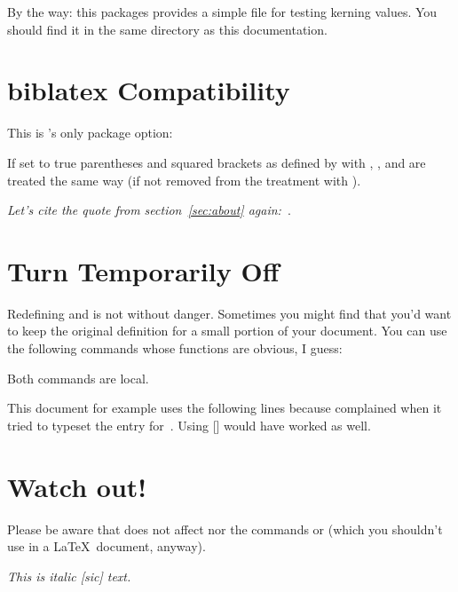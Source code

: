 \documentclass[DIV10,toc=index,toc=bib]{cnpkgdoc}
\begin{document}
By the way: this packages provides a simple file 
for testing kerning values. You should find it in the same directory as this
documentation.

\section{biblatex Compatibility}
This is \embrac's only package option:
\begin{beschreibung}
  If set to true parentheses
 and squared brackets as defined by  with ,
 ,  and  are treated
 the same way (if not removed from the treatment with ).
\end{beschreibung}

\begin{beispiel}
 \emph{Let's cite the quote from section~\ref{sec:about} again:~\cite{bringhurst04}}.
\end{beispiel}

\section{Turn \embrac Temporarily Off}
Redefining  and  is not without danger. Sometimes you might
find that you'd want to keep the original definition for a small portion of your
document. You can use the following commands whose functions are obvious, I guess:
\begin{beschreibung}
\end{beschreibung}
Both commands are local.

This document for example uses the following lines because 
complained when it tried to typeset the entry for~\cite{bringhurst04}. Using
[] would have worked as well.
\begin{beispiel}
 \EmbracOff
 \printbibliography
\end{beispiel}

\section{Watch out!}
Please be aware that \embrac does not affect  nor the commands
 or  (which you shouldn't use in a \LaTeX\ document, anyway).
\begin{beispiel}
 \itshape This is italic [sic] text.
\end{beispiel}

\EmbracOff
\printbibliography


\printindex
\end{document}
